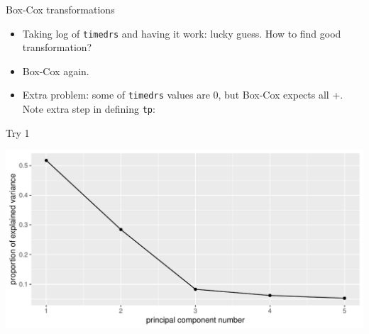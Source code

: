 \begin{frame}[fragile]{Box-Cox transformations}


  \begin{itemize}
  \item Taking log of \verb-timedrs- and having it work: lucky
    guess. How to find good transformation?
  \item Box-Cox again.
  \item Extra problem: some of \verb-timedrs- values are 0, but Box-Cox expects all
    +. Note extra step in defining \texttt{tp}:

 
\begin{knitrout}
\color{fgcolor}\begin{kframe}
\begin{alltt}
\hlkwb{=}\hlopt{+}
\end{alltt}
\end{kframe}
\end{knitrout}
    
 
\begin{knitrout}
\color{fgcolor}\begin{kframe}
\begin{alltt}
\hlopt{~}\hlopt{+}\hlopt{+}
\end{alltt}
\end{kframe}
\end{knitrout}
  \end{itemize}

\end{frame}


\begin{frame}[fragile]{Try 1}

 
\begin{knitrout}
\color{fgcolor}
\includegraphics[width=\maxwidth]{figure/unnamed-chunk-27-1} 

\end{knitrout}
  
  
\end{frame}

